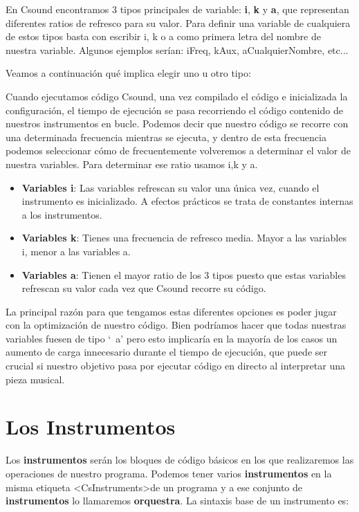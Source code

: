 En Csound encontramos 3 tipos principales de variable: \textbf{i}, \textbf{k} y \textbf{a}, que representan diferentes ratios de refresco para su valor. Para definir una variable de cualquiera de estos tipos basta con escribir i, k o a como primera letra del nombre de nuestra variable. Algunos ejemplos serían: iFreq, kAux, aCualquierNombre, etc...

Veamos a continuación qué implica elegir uno u otro tipo:

Cuando ejecutamos código Csound, una vez compilado el código e inicializada la configuración, el tiempo de ejecución se pasa recorriendo el código contenido de nuestros instrumentos en bucle. Podemos decir que nuestro código se recorre con una determinada frecuencia mientras se ejecuta, y dentro de esta frecuencia podemos seleccionar cómo de frecuentemente volveremos a determinar el valor de nuestra variables. Para determinar ese ratio usamos i,k y a.

\begin{itemize}
 \item \textbf{Variables i}: Las variables refrescan su valor una única vez, cuando el instrumento es inicializado. A efectos prácticos se trata de constantes internas a los instrumentos.
 
 \item \textbf{Variables k}: Tienes una frecuencia de refresco media. Mayor a las variables i, menor a las variables a.
 
 \item \textbf{Variables a}: Tienen el mayor ratio de los 3 tipos puesto que estas variables refrescan su valor cada vez que Csound recorre su código.

\end{itemize}

La principal razón para que tengamos estas diferentes opciones es poder jugar con la optimización de nuestro código. Bien podríamos hacer que todas nuestras variables fuesen de tipo `\ a' pero esto implicaría en la mayoría de los casos un aumento de carga innecesario durante el tiempo de ejecución, que puede ser crucial si nuestro objetivo pasa por ejecutar código en directo al interpretar una pieza musical.

\section{Los Instrumentos}\label{sec:Instrumentos}
Los \textbf{instrumentos} serán los bloques de código básicos en los que realizaremos las operaciones de nuestro programa. Podemos tener varios \textbf{instrumentos} en la misma etiqueta \textless CsInstruments\textgreater de un programa y a ese conjunto de \textbf{instrumentos} lo llamaremos \textbf{orquestra}.
La sintaxis base de un instrumento es:

